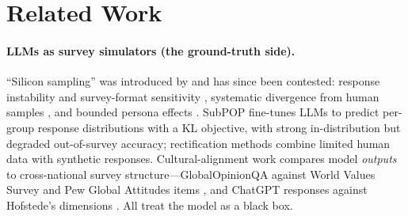 \section{Related Work}
\label{sec:related}

\paragraph{LLMs as survey simulators (the ground-truth side).}
``Silicon sampling'' was introduced by \citet{argyle2023} and has since
been contested: response instability and survey-format sensitivity
\citep{dominguez2024, rottger2024}, systematic divergence from human
samples \citep{bisbee2024}, and bounded persona effects
\citep{hucollier2024}. SubPOP \citep{subpop2025} fine-tunes LLMs to
predict per-group response distributions with a KL objective, with strong
in-distribution but degraded out-of-survey accuracy; rectification methods
\citep{rectification2025} combine limited human data with synthetic
responses. Cultural-alignment work compares model
\emph{outputs} to cross-national survey structure---GlobalOpinionQA
against World Values Survey and Pew Global Attitudes items
\citep{globalopinions2023}, and ChatGPT responses against Hofstede's
dimensions \citep{culturalalign2023}. All treat the model as a black box.

